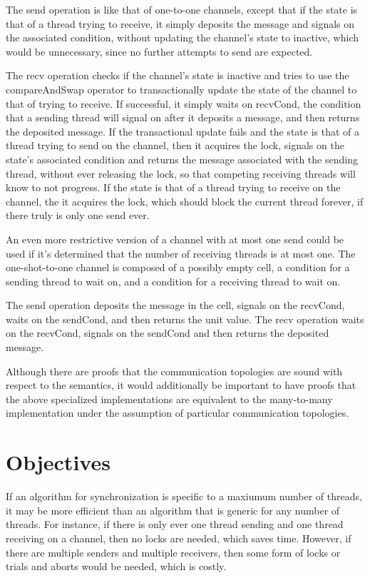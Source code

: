 The send operation is like that of one-to-one channels, except that if the state is that of a
thread trying to receive, it simply deposits the message and signals on the associated
condition, without updating the channel's state to inactive, which would be unnecessary, since
no further attempts to send are expected.

The recv operation checks if the channel's state is inactive and tries to use the
compareAndSwap operator to transactionally update the state of the channel to that of trying
to receive.  If successful, it simply waits on recvCond, the condition that a sending thread
will signal on after it deposits a message, and then returns the deposited message.  If the
transactional update fails and the state is that of a thread trying to send on the channel,
then it acquires the lock, signals on the state's associated condition and returns the message
associated with the sending thread, without ever releasing the lock, so that competing
receiving threads will know to not progress.  If the state is that of a thread trying to
receive on the channel, the it acquires the lock, which should block the current thread
forever, if there truly is only one send ever.

An even more restrictive version of a channel with at most one send could be used if it's
determined that the number of receiving threads is at most one.  The one-shot-to-one channel is
composed of a possibly empty cell, a condition for a sending thread to wait on, and a condition
for a receiving thread to wait on.

The send operation deposits the message in the cell, signals on the recvCond, waits on the
sendCond, and then returns the unit value.  The recv operation waits on the recvCond, signals
on the sendCond and then returns the deposited message.

Although there are proofs that the communication topologies are sound with respect to the
semantics, it would additionally be important to have proofs that the above specialized
implementations are equivalent to the many-to-many implementation under the assumption of
particular communication topologies.


\section{Objectives}
If an algorithm for synchronization is specific to a maxiumum number of threads, it may be more
efficient than an algorithm that is generic for any number of threads.  For instance, if there
is only ever one thread sending and one thread receiving on a channel, then no locks are
needed, which saves time.  However, if there are multiple senders and multiple receivers, then
some form of locks or trials and aborts would be needed, which is costly.

